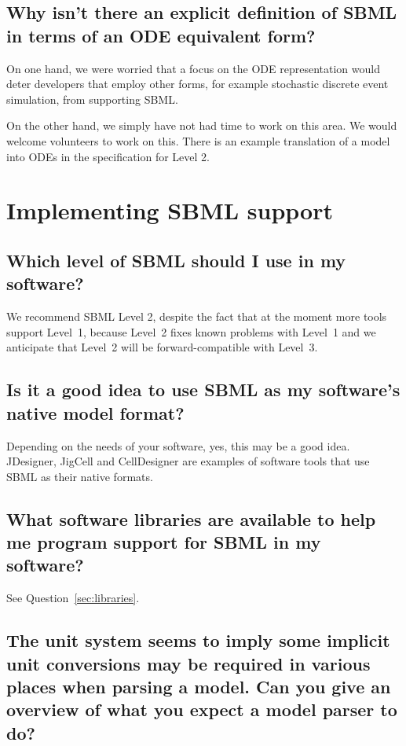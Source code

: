 \documentclass{sbmlfaq}
\begin{document}
\subsection{Why isn't there an explicit definition of SBML in terms of an
  ODE equivalent form?} 

On one hand, we were worried that a focus on the ODE representation would
deter developers that employ other forms, for example stochastic discrete
event simulation, from supporting SBML.

On the other hand, we simply have not had time to work on this area.  We
would welcome volunteers to work on this.  There is an example translation of
a model into ODEs in the specification for Level 2.


\section{Implementing SBML support}

\subsection{Which level of SBML should I use in my software?}
\label{sec:which-level-to-use}

We recommend SBML Level 2, despite the fact that at the moment more tools
support Level~1, because Level~2 fixes known problems with Level~1 and
we anticipate that Level~2 will be forward-compatible with Level~3.


\subsection{Is it a good idea to use SBML as my software's native model format?}

Depending on the needs of your software, yes, this may be a good idea.
JDesigner, JigCell and CellDesigner are examples of software tools that use
SBML as their native formats.


\subsection{What software libraries are available to help me program
  support for SBML in my software?}  

See Question~\ref{sec:libraries}.


\subsection{The unit system seems to imply some implicit unit conversions may be required in various places when parsing a model.
Can you give an overview of what you expect a model parser to do?}
\end{document}
